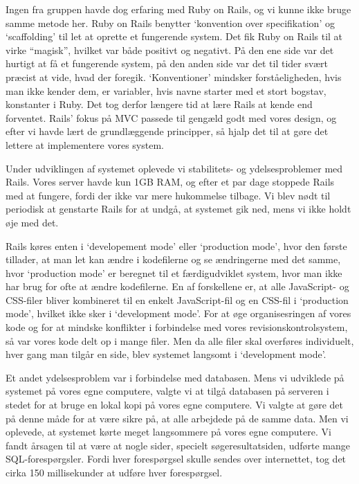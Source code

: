 Ingen fra gruppen havde dog erfaring med Ruby on Rails, og vi kunne ikke bruge samme metode her. Ruby on Rails benytter `konvention over specifikation' og `scaffolding' til let at oprette et fungerende system. Det fik Ruby on Rails til at virke ``magisk'', hvilket var både positivt og negativt. På den ene side var det hurtigt at få et fungerende system, på den anden side var det til tider svært præcist at vide, hvad der foregik. `Konventioner' mindsker forståeligheden, hvis man ikke kender dem, \fx er variabler, hvis navne starter med et stort bogstav, konstanter i Ruby. Det tog derfor længere tid at lære Rails at kende end forventet. 
Rails' fokus på MVC passede til gengæld godt med vores design, og efter vi havde lært de grundlæggende principper, så hjalp det til at gøre det lettere at implementere vores system.

Under udviklingen af systemet oplevede vi stabilitets- og ydelsesproblemer med Rails. Vores server havde kun 1GB RAM, og efter et par dage stoppede Rails med at fungere, fordi der ikke var mere hukommelse tilbage. Vi blev nødt til periodisk at genstarte Rails for at undgå, at systemet gik ned, mens vi ikke holdt øje med det.

Rails køres enten i `developement mode' eller `production mode', hvor den første tillader, at man let kan ændre i kodefilerne og se ændringerne med det samme, hvor `production mode' er beregnet til et færdigudviklet system, hvor man ikke har brug for ofte at ændre kodefilerne. En af forskellene er, at alle JavaScript- og CSS-filer bliver kombineret til en enkelt JavaScript-fil og en CSS-fil i `production mode', hvilket ikke sker i `development mode'. For at øge organisesringen af vores kode og for at mindske konflikter i forbindelse med vores revisionskontrolsystem, så var vores kode delt op i mange filer. Men da alle filer skal overføres individuelt, hver gang man tilgår en side, blev systemet langsomt i `development mode'.

Et andet ydelsesproblem var i forbindelse med databasen. Mens vi udviklede på systemet på vores egne computere, valgte vi at tilgå databasen på serveren i stedet for at bruge en lokal kopi på vores egne computere. Vi valgte at gøre det på denne måde for at være sikre på, at alle arbejdede på de samme data. Men vi oplevede, at systemet kørte meget langsommere på vores egne computere. Vi fandt årsagen til at være at nogle sider, specielt søgeresultatsiden, udførte mange SQL-forespørgsler. Fordi hver forespørgsel skulle sendes over internettet, tog det cirka 150 millisekunder at udføre hver forespørgsel.

